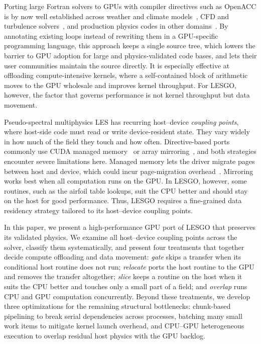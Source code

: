 Porting large Fortran solvers to GPUs with compiler directives such as
OpenACC is by now well established across weather and climate
models~\cite{lapillonne2014,govett2017nim,norman2015,giorgetta2022,esclapez2025dales},
CFD and turbulence
solvers~\cite{xia2015,otero2019nek,devanna2023uranos}, and production
physics codes in other domains~\cite{caplan2019mas}. By
annotating existing loops instead of rewriting them in a GPU-specific programming
language, this approach keeps a single source tree, which lowers the 
barrier to GPU adoption for large and physics-validated code bases, and lets their user communities maintain the source directly. 
It is especially effective at offloading
compute-intensive kernels, where a self-contained block of arithmetic
moves to the GPU wholesale and improves kernel throughput. For
LESGO, however, the factor that governs performance is
not kernel throughput but data movement.

Pseudo-spectral multiphysics LES has recurring host--device
\emph{coupling points}, where host-side code must read or write
device-resident state. They vary widely in how much of the field they
touch and how often. Directive-based ports commonly use CUDA managed
memory~\cite{caplan2023dc} or array
mirroring~\cite{esclapez2025dales,giorgetta2022,xiao2025cales}, and
both strategies encounter severe limitations here. Managed memory lets the driver migrate
pages between host and device, which could incur page-migration overhead~\cite{chien2019um}. Mirroring works best when all computation
runs on the GPU. In LESGO, however, some routines, such as the airfoil
table lookups, suit the CPU better and should stay on the host for good
performance.
Thus, LESGO requires a fine-grained data
residency strategy tailored to its host--device coupling points.

In this paper, we present a high-performance GPU port of LESGO that preserves its
validated physics. We examine all host--device coupling points across
the solver, classify them systematically, and present four
treatments that together decide
compute offloading and data movement: \emph{gate} skips a transfer
when its conditional host routine does not run;
\emph{relocate} ports the host routine to the GPU and removes the
transfer altogether; \emph{slice} keeps a routine on the host when it
suits the CPU better and touches only a small part of a field; 
and \emph{overlap} runs CPU and GPU computation concurrently. Beyond these treatments, we develop
three optimizations for the remaining structural bottlenecks: chunk-based
pipelining to break serial dependencies across processes,
batching many small work items to mitigate kernel
launch overhead, and CPU--GPU heterogeneous execution to overlap
residual host physics with the GPU backlog.


